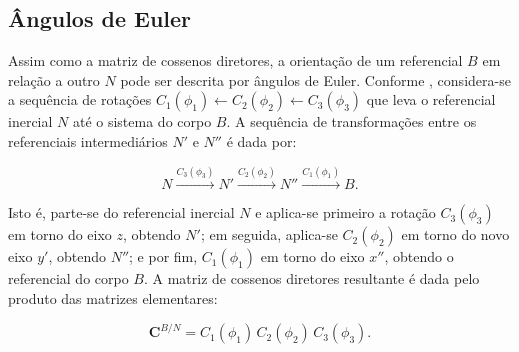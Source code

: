 
\subsection{Ângulos de Euler}
\label{sec_angulos_euler}

Assim como a matriz de cossenos diretores, a orientação de um referencial $B$ em relação a outro $N$ pode ser descrita por ângulos de Euler.
Conforme \cite{wie2008space}, considera-se a sequência de rotações $C_1(\phi_1) \leftarrow C_2(\phi_2) \leftarrow C_3(\phi_3)$ que leva o referencial inercial $N$ até o sistema do corpo $B$.
A sequência de transformações entre os referenciais intermediários $N'$ e $N''$ é dada por:

\begin{equation}
N \xrightarrow{C_3(\phi_3)} N' \xrightarrow{C_2(\phi_2)} N'' \xrightarrow{C_1(\phi_1)} B.
\end{equation}

Isto é, parte-se do referencial inercial $N$ e aplica-se primeiro a rotação $C_3(\phi_3)$ em torno do eixo $z$, obtendo $N'$; em seguida, aplica-se $C_2(\phi_2)$ em torno do novo eixo $y'$, obtendo $N''$; e por fim, $C_1(\phi_1)$ em torno do eixo $x''$, obtendo o referencial do corpo $B$.
A matriz de cossenos diretores resultante é dada pelo produto das matrizes elementares:

\begin{equation}
\label{eq_sequencia_c1c2c3}
\mathbf{C}^{B/N}
=
C_1(\phi_1)\,C_2(\phi_2)\,C_3(\phi_3).
\end{equation}

